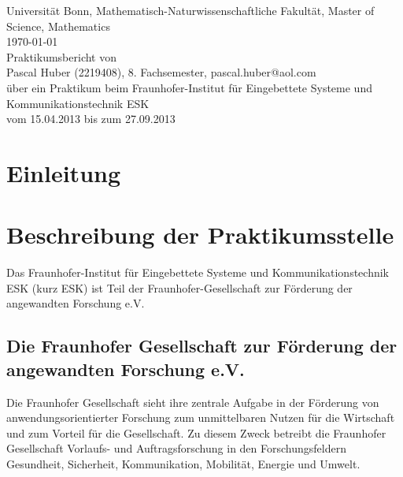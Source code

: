 \documentclass[a4paper, twoside]{scrartcl}
\begin{document}
\begin{titlepage}
  \begin{center}
    \sf
    Universität Bonn, Mathematisch-Naturwissenschaftliche Fakultät, Master of Science, Mathematics \\
    \vspace{1cm}
    \today \\
    \vspace{3cm}
    {\LARGE Praktikumsbericht von} \\
    \vspace{1cm}
    Pascal Huber (2219408), 8. Fachsemester, pascal.huber@aol.com \\
    \vspace{2cm}
    {\LARGE über ein Praktikum beim Fraunhofer-Institut für Eingebettete Systeme und Kommunikationstechnik ESK} \\
    \vspace{1cm}
    vom 15.04.2013 bis zum 27.09.2013 \\
  \end{center}
\end{titlepage}


\tableofcontents
\newpage

\section{Einleitung}
\label{sec:einleitung}



\section{Beschreibung der Praktikumsstelle}
\label{sec:beschr-der-prakt}

Das Fraunhofer-Institut für Eingebettete Systeme und Kommunikationstechnik ESK (kurz ESK) ist Teil der Fraunhofer-Gesellschaft zur Förderung der angewandten Forschung e.V. 


\subsection{Die Fraunhofer Gesellschaft zur Förderung der angewandten Forschung e.V.}
\label{sec:die-fraunh-gesellsch}

Die Fraunhofer Gesellschaft sieht ihre zentrale Aufgabe in der Förderung von anwendungsorientierter Forschung zum unmittelbaren Nutzen für die Wirtschaft und zum Vorteil für die Gesellschaft. Zu diesem Zweck betreibt die Fraunhofer Gesellschaft Vorlaufs- und Auftragsforschung in den Forschungsfeldern Gesundheit, Sicherheit, Kommunikation, Mobilität, Energie und Umwelt. 
\end{document}
